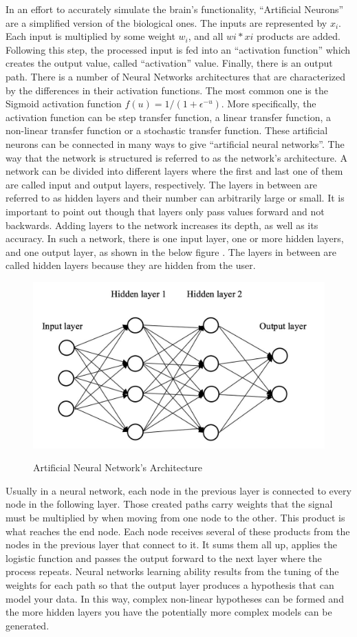 In an effort to accurately simulate the brain’s functionality, “Artificial Neurons” are a simplified version of the biological ones. The inputs are represented by $x_{i}$. Each input is multiplied by some weight $w_{i}$, and all $w{i}*x{i}$ products are added. Following this step, the processed input is fed into an “activation function” which creates the output value, called “activation” value. Finally, there is an output path. There is a number of Neural Networks architectures that are characterized by the differences in their activation functions. The most common one is the Sigmoid activation function $f(u)=1/(1+ \epsilon^{-u})$. More specifically, the activation function can be step transfer function, a linear transfer function, a non-linear transfer function or a stochastic transfer function. These artificial neurons can be connected in many ways to give “artificial neural networks”. The way that the network is structured is referred to as the network’s architecture. A network can be divided into different layers where the first and last one of them are called input and output layers, respectively. The layers in between are referred to as hidden layers and their number can arbitrarily large or small. It is important to point out though that layers only pass values forward and not backwards. Adding layers to the network increases its depth, as well as its accuracy. In such a network, there is one input layer, one or more hidden layers, and one output layer, as shown in the below figure \cite{liu2018r}. The layers in between are called hidden layers because they are hidden from the user.
\begin{figure}[h!]
\centering
\includegraphics[width=0.8\linewidth]{project/testw.JPG}
\label{fig:felix}
\caption{Artificial Neural Network's Architecture}
\end{figure}
\par Usually in a neural network, each node in the previous layer is connected to every node in the following layer. Those created paths carry weights that the signal must be multiplied by when moving from one node to the other. This product is what reaches the end node. Each node receives several of these products from the nodes in the previous layer that connect to it. It sums them all up, applies the logistic function and passes the output forward to the next layer where the process repeats. Neural networks learning ability results from the tuning of the weights for each path so that the output layer produces a hypothesis that can model your data. In this way, complex non-linear hypotheses can be formed and the more hidden layers you have the potentially more complex models can be generated. 
